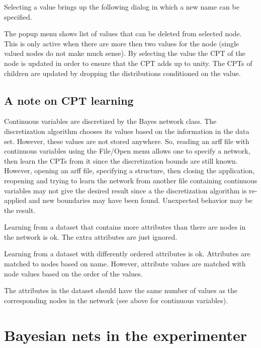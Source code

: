 Selecting a value brings up the following dialog in which a new name
can be specified.
\begin{center}
\end{center}

The popup menu shows list of values that can be deleted from selected node.
This is only active when there are more then two values for the node (single
valued nodes do not make much sense).
By selecting the value the CPT of the node is updated in order to ensure
that the CPT adds up to unity. The CPTs of children are updated by dropping
the distributions conditioned on the value.
\begin{center}
\end{center}


\subsection*{A note on CPT learning}

Continuous variables are discretized by the Bayes network class.
The discretization algorithm chooses its values based on the information
in the data set. However, these values are not stored anywhere. So,
reading an arff file with continuous variables using the File/Open menu
allows one to specify a network, then learn the CPTs from it since the
discretization bounds are still known. However, opening an arff file, specifying
a structure, then closing the application, reopening and trying to learn the
network from another file containing continuous variables may not give the
desired result since a the discretization algorithm is re-applied and new
boundaries may have been found. Unexpected behavior may be the result.

Learning from a dataset that contains more attributes than there are nodes
in the network is ok. The extra attributes are just ignored.

Learning from a dataset with differently ordered attributes is ok. Attributes
are matched to nodes based on name. However, attribute values are matched
with node values based on the order of the values.

The attributes in the dataset should have the same number of values as the
corresponding nodes in the network (see above for continuous variables).

\section{Bayesian nets in the experimenter}

